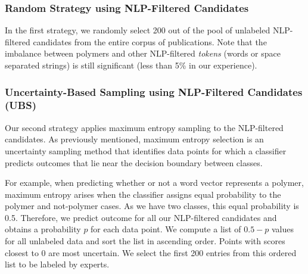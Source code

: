 \subsubsection{Random Strategy using NLP-Filtered Candidates}
In the first strategy, we randomly select 200 out of the pool of unlabeled NLP-filtered candidates from the entire corpus of publications.
Note that the imbalance between polymers and other NLP-filtered \textit{tokens} (words or space separated strings)  is still significant (less than 5\% in our experience).

\subsubsection{Uncertainty-Based Sampling using NLP-Filtered Candidates (UBS)}
Our second strategy applies maximum entropy sampling to the NLP-filtered candidates. %
As previously mentioned, maximum entropy selection is an uncertainty sampling method that
identifies data points for which a classifier predicts outcomes that lie near the decision boundary 
between classes. 

For example, when predicting whether or not a word vector represents a polymer, maximum entropy arises when the classifier assigns equal probability to the polymer and not-polymer cases.
As we have two classes, this equal probability is 0.5.
Therefore, we predict outcome for all our NLP-filtered candidates and obtains a probability $p$ for each data point. We compute a list of $0.5-p$ values for all unlabeled data and sort the list in ascending order.
Points with scores closest to $0$ are most uncertain.
We select the first 200 entries from this ordered list to be labeled by experts.


